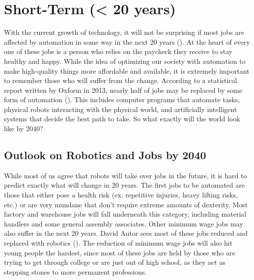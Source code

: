\section{Short-Term (< 20 years)}
\label{sec:short}

With the current growth of technology, it will not be surprising if most jobs are affected by automation in some way in the next 20 years (\cite{1/2Jobs20Years}). At the heart of every one of these jobs is a person who relies on the paycheck they receive to stay healthy and happy. While the idea of optimizing our society with automation to make high-quality things more affordable and available, it is extremely important to remember those who will suffer from the change. According to a statistical report written by Oxform in 2013, nearly half of jobs may be replaced by some form of automation (\cite{OxfordJobsAreComputerized}). This includes computer programs that automate tasks, physical robots interacting with the physical world, and artificially intelligent systems that decide the best path to take. So what exactly will the world look like by 2040?

\subsection{Outlook on Robotics and Jobs by 2040}

While most of us agree that robots will take over jobs in the future, it is hard to predict exactly what will change in 20 years. The first jobs to be automated are those that either pose a health risk (ex. repetitive injuries, heavy lifting risks, etc.) or are very mundane that don't require extreme amounts of dexterity. Most factory and warehouse jobs will fall underneath this category, including material handlers and some general assembly associates. Other minimum wage jobs may also suffer in the next 20 years. David Autor sees most of these jobs reduced and replaced with robotics (\cite{WhyStillSoManyJobs}). The reduction of minimum wage jobs will also hit young people the hardest, since most of these jobs are held by those who are trying to get through college or are just out of high school, as they act as stepping stones to more permanent professions. 

